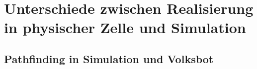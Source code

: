 \section{Unterschiede zwischen Realisierung in physischer Zelle und Simulation}

\subsection{Pathfinding in Simulation und Volksbot}
